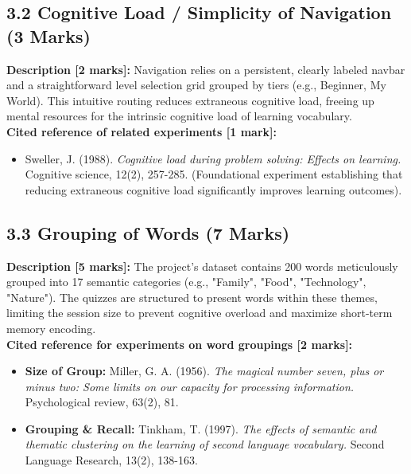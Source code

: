 \documentclass[12pt,a4paper]{article}
\begin{document}
\subsection*{3.2 Cognitive Load / Simplicity of Navigation (3 Marks)}
\textbf{Description [2 marks]:} Navigation relies on a persistent, clearly labeled navbar and a straightforward level selection grid grouped by tiers (e.g., Beginner, My World). This intuitive routing reduces extraneous cognitive load, freeing up mental resources for the intrinsic cognitive load of learning vocabulary. \\
\textbf{Cited reference of related experiments [1 mark]:}
\begin{itemize}[label={--}]
    \item Sweller, J. (1988). \textit{Cognitive load during problem solving: Effects on learning.} Cognitive science, 12(2), 257-285. (Foundational experiment establishing that reducing extraneous cognitive load significantly improves learning outcomes).
\end{itemize}

\subsection*{3.3 Grouping of Words (7 Marks)}
\textbf{Description [5 marks]:} The project's dataset contains 200 words meticulously grouped into 17 semantic categories (e.g., "Family", "Food", "Technology", "Nature"). The quizzes are structured to present words within these themes, limiting the session size to prevent cognitive overload and maximize short-term memory encoding. \\
\textbf{Cited reference for experiments on word groupings [2 marks]:}
\begin{itemize}[label={--}]
    \item \textbf{Size of Group:} Miller, G. A. (1956). \textit{The magical number seven, plus or minus two: Some limits on our capacity for processing information.} Psychological review, 63(2), 81.
    \item \textbf{Grouping \& Recall:} Tinkham, T. (1997). \textit{The effects of semantic and thematic clustering on the learning of second language vocabulary.} Second Language Research, 13(2), 138-163.
\end{itemize}
\end{document}

